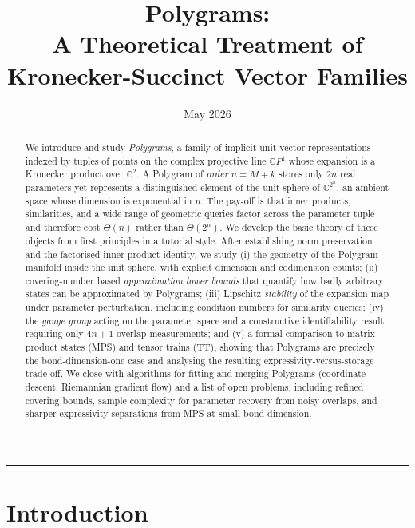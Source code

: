 \documentclass[11pt,letterpaper]{article}
\title{\textbf{Polygrams:\\
A Theoretical Treatment of Kronecker-Succinct Vector Families}}
\author{}
\date{May 2026}
\theoremstyle{definition}
\newcommand{\C}{\mathbb{C}}
\begin{document}
\maketitle

\begin{abstract}
We introduce and study \emph{Polygrams}, a family of implicit unit-vector
representations indexed by tuples of points on the complex projective line
$\C P^1$ whose expansion is a Kronecker product over $\C^2$. A Polygram of
\emph{order} $n = M + k$ stores only $2n$ real parameters yet represents a
distinguished element of the unit sphere of $\C^{2^{n}}$, an ambient space whose
dimension is exponential in $n$. The pay-off is that inner products,
similarities, and a wide range of geometric queries factor across the parameter
tuple and therefore cost $\Theta(n)$ rather than $\Theta(2^{n})$. We develop the
basic theory of these objects from first principles in a tutorial style. After
establishing norm preservation and the factorised-inner-product identity, we
study (i) the geometry of the Polygram manifold inside the unit sphere, with
explicit dimension and codimension counts; (ii) covering-number based
\emph{approximation lower bounds} that quantify how badly arbitrary states can
be approximated by Polygrams; (iii) Lipschitz \emph{stability} of the expansion
map under parameter perturbation, including condition numbers for similarity
queries; (iv) the \emph{gauge group} acting on the parameter space and a
constructive identifiability result requiring only $4n + 1$ overlap measurements;
and (v) a formal comparison to matrix product states (MPS) and tensor trains
(TT), showing that Polygrams are precisely the bond-dimension-one case and
analysing the resulting expressivity-versus-storage trade-off. We close with
algorithms for fitting and merging Polygrams (coordinate descent, Riemannian
gradient flow) and a list of open problems, including refined covering
bounds, sample complexity for parameter recovery from noisy overlaps, and
sharper expressivity separations from MPS at small bond dimension.
\end{abstract}

\tableofcontents
\bigskip
\hrule
\bigskip

\section{Introduction}
\end{document}
